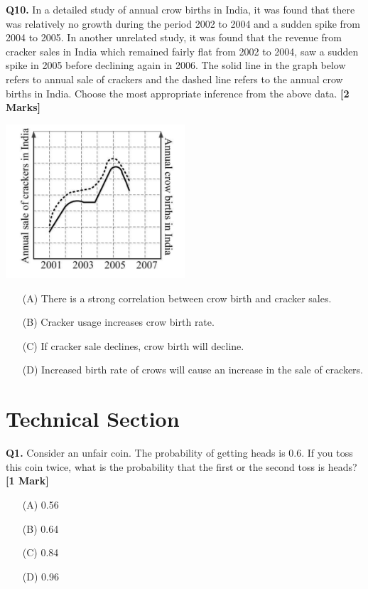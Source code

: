 \documentclass[11pt]{article}
\newcommand{\questiona}[2]{
    \noindent\textbf{Q#2.} #1 \hfill \textbf{[1 Mark]}
}
\newcommand{\questionb}[2]{
    \noindent\textbf{Q#2.} #1 \hfill \textbf{[2 Marks]}
}
\begin{document}
\questionb{In a detailed study of annual crow births in India, it was found that there was relatively no growth during the period 2002 to 2004 and a sudden spike from 2004 to 2005. In another unrelated study, it was found that the revenue from cracker sales in India which remained fairly flat from 2002 to 2004, saw a sudden spike in 2005 before declining again in 2006. The solid line in the graph below refers to annual sale of crackers and the dashed line refers to the annual crow births in India. Choose the most appropriate inference from the above data.}{10}
\begin{center}
\includegraphics[width=0.5\textwidth]{figures/10.png}
\end{center}
\begin{enumerate}
    \item[(A)] There is a strong correlation between crow birth and cracker sales.  
    \item[(B)] Cracker usage increases crow birth rate.  
    \item[(C)] If cracker sale declines, crow birth will decline.  
    \item[(D)] Increased birth rate of crows will cause an increase in the sale of crackers.  
\end{enumerate}
\vspace{0.5cm}

\section*{Technical Section}

\questiona{Consider an unfair coin. The probability of getting heads is 0.6. If you toss this coin twice, what is the probability that the first or the second toss is heads?}{1}
\begin{enumerate}
    \item[(A)] 0.56  
    \item[(B)] 0.64  
    \item[(C)] 0.84  
    \item[(D)] 0.96  
\end{enumerate}
\vspace{0.5cm}
\end{document}
